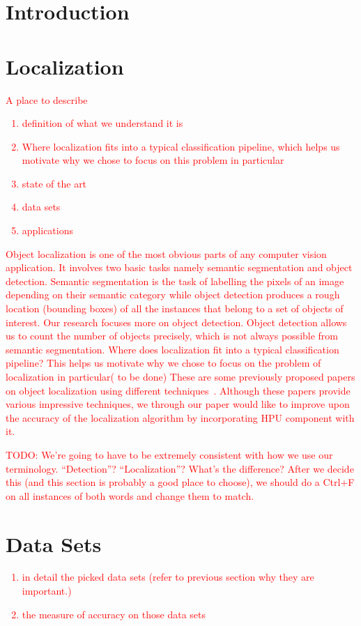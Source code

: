 \documentclass[10pt,twocolumn,letterpaper]{article}
\newcommand{\preliminary}[1]{\textcolor{red}{#1}}
\begin{document}
\section{Introduction}

\section{Localization}
\preliminary{
A place to describe
\begin{enumerate}
\item definition of what we understand it is
\item Where localization fits into a typical classification pipeline, which helps us motivate why we chose to focus on this problem in particular
\item state of the art
\item data sets
\item applications
\end{enumerate}
}

\preliminary {
Object localization is one of the most obvious parts of any computer vision application. It involves two basic tasks namely semantic segmentation and object detection. Semantic segmentation is the task of labelling the pixels of an image depending on their semantic category while object detection produces a rough location (bounding boxes) of all the instances that belong to a set of objects of interest. Our research focuses more on object detection. Object detection allows us to count the number of objects precisely, which is not always possible from semantic segmentation.
Where does localization fit into a typical classification pipeline? This helps us motivate why we chose to focus on the problem of localization in particular( to be done)
These are some previously proposed papers on object localization using different techniques~\cite{localization01,localization02}. Although these papers provide various impressive techniques, we through our paper would like to improve upon the accuracy of the localization algorithm by incorporating HPU component with it.
}

\preliminary{
TODO: We're going to have to be extremely consistent with how we use our terminology. ``Detection''? ``Localization''? What's the difference? After we decide this (and this section is probably a good place to choose), we should do a Ctrl+F on all instances of both words and change them to match.
}


\section{Data Sets}
\preliminary{
\begin{enumerate}
\item in detail the picked data sets (refer to previous section why they are important.)
\item the measure of accuracy on those data sets
\end{enumerate}
}
\end{document}
